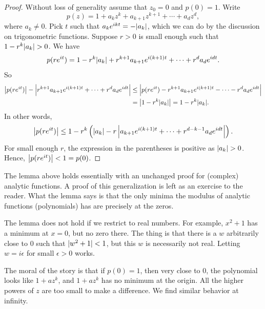 \begin{proof}
Without loss of generality assume that $z_0 = 0$ and $p(0) = 1$.  Write
\begin{equation*}
p(z) = 1+a_kz^k + a_{k+1}z^{k+1} + \cdots + a_d z^d ,
\end{equation*}
where $a_k \not= 0$.  Pick $t$ such that $a_k e^{ikt} = -\lvert {a_k} \rvert$, which
we can do by the discussion on trigonometric functions.  Suppose
$r > 0$ is small enough such that
$1-r^k \lvert {a_k} \rvert > 0$.  We have
\begin{equation*}
p(r e^{it}) =
1-r^k \lvert {a_k} \rvert + r^{k+1}a_{k+1}e^{i(k+1)t} + \cdots + r^{d}a_{d}e^{idt} .
\end{equation*}
So
\begin{equation*}
\begin{split}
\left\lvert {
p(r e^{it}) } \right\rvert - \left\lvert {
r^{k+1}a_{k+1}e^{i(k+1)t} + \cdots + r^{d}a_{d}e^{idt}
} \right\rvert
& \leq
\left\lvert {
p(r e^{it}) 
- r^{k+1}a_{k+1}e^{i(k+1)t} - \cdots - r^{d}a_{d}e^{idt}
} \right\rvert
\\
& =
\left\lvert {
1-r^k \lvert {a_k} \rvert
} \right\rvert
=
1-r^k \lvert {a_k} \rvert .
\end{split}
\end{equation*}
In other words,
\begin{equation*}
\left\lvert {
p(r e^{it}) } \right\rvert
\leq
1-r^k \left( \lvert {a_k} \rvert
-
r
\left\lvert {
a_{k+1}e^{i(k+1)t} + \cdots + r^{d-k-1}a_{d}e^{idt}
} \right\rvert
\right) .
\end{equation*}
For small enough $r$, the expression in the parentheses is positive
as $\lvert {a_k} \rvert > 0$.  Hence, $\left\lvert {p(re^{it})} \right\rvert < 1 = p(0)$.
\end{proof}

\begin{remark}
The lemma above holds essentially with an unchanged proof for (complex) analytic
functions.  A proof of this generalization is left as an exercise to the reader.
What the lemma
says is that the only minima the modulus of analytic functions (polynomials)
has are precisely at the zeros.
\end{remark}

\begin{remark}
The lemma does not hold if we restrict to real numbers.  For
example, $x^2+1$ has a minimum at $x=0$, but no zero there.  The thing is that
there is a $w$ arbitrarily close to $0$ such that $\lvert {w^2+1} \rvert < 1$, but this
$w$ is necessarily not real.  Letting $w = i\epsilon$ for small
$\epsilon > 0$ works.
\end{remark}

The moral of the story is that if $p(0) = 1$, then very close to 0, the
polynomial
looks like $1+az^k$, and $1+az^k$ has no minimum at the origin.  All the higher
powers of $z$ are too small to make a difference.  We find similar behavior
at infinity.

